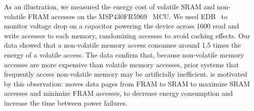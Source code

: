 As an illustration, we measured the energy cost of volatile SRAM and non-volatile FRAM accesses on
the MSP430FR5969~\cite{msp430datasheet} MCU. We used EDB~\cite{edb} to monitor
voltage drop on a capacitor powering the device across 1600 read and write
accesses to each memory, randomizing accesses to avoid caching effects. Our
data showed that a non-volatile memory access consumes around 1.5 times the
energy of a volatile access. The data confirm that, because non-volatile memory
accesses are more expensive than volatile memory accesses, prior systems that
frequently access non-volatile memory may be artificially inefficient.
\sys is motivated by this observation: \sys 
moves data pages from FRAM to SRAM to maximize SRAM accesses and minimize FRAM
accesses, to decrease energy consumption and increase the time between power
failures. 

